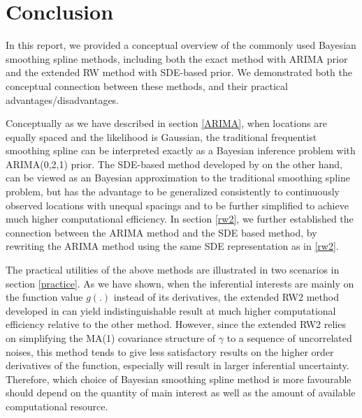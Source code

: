 \documentclass{article}
\begin{document}
\section{Conclusion}\label{conclusion}

In this report, we provided a conceptual overview of the commonly used Bayesian smoothing spline methods, including both the exact method with ARIMA prior and the extended RW method with SDE-based prior. We demonstrated both the conceptual connection between these methods, and their practical advantages/disadvantages. 

Conceptually as we have described in section \ref{ARIMA}, when locations are equally spaced and the likelihood is Gaussian, the traditional frequentist smoothing spline can be interpreted exactly as a Bayesian inference problem with ARIMA(0,2,1) prior. The SDE-based method developed by \cite{rw2} on the other hand, can be viewed as an Bayesian approximation to the traditional smoothing spline problem, but has the advantage to be generalized consistently to continuously observed locations with unequal spacings and to be further simplified to achieve much higher computational efficiency. In section \ref{rw2}, we further established the connection between the ARIMA method and the SDE based method, by rewriting the ARIMA method using the same SDE representation as in \ref{rw2}.

The practical utilities of the above methods are illustrated in two scenarios in section \ref{practice}. As we have shown, when the inferential interests are mainly on the function value $g(.)$ instead of its derivatives, the extended RW2 method developed in \cite{rw2} can yield indistinguishable result at much higher computational efficiency relative to the other method. However, since the extended RW2 relies on simplifying the MA(1) covariance structure of $\gamma$ to a sequence of uncorrelated noises, this method tends to give less satisfactory results on the higher order derivatives of the function, especially will result in larger inferential uncertainty. Therefore, which choice of Bayesian smoothing spline method is more favourable should depend on the quantity of main interest as well as the amount of available computational resource.
\end{document}
